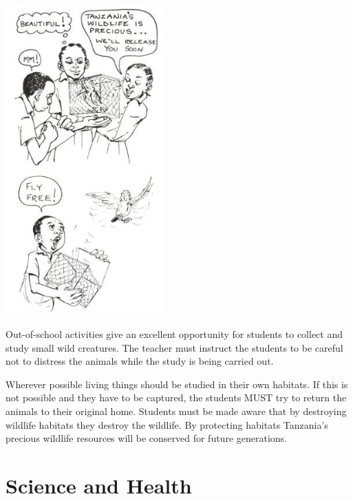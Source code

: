 \begin{multicols}{2}
\begin{center}
\includegraphics[width=0.45\textwidth]{./img/source/wildlife.jpg}
\end{center}

Out-of-school activities give an excellent
opportunity for students to collect and study
small wild creatures. The teacher must instruct
the students to be careful not to distress the
animals while the study is being carried out.

Wherever possible living things should be
studied in their own habitats. If this is not
possible and they have to be captured, the
students MUST try to return the animals to their
original home. Students must be made aware
that by destroying wildlife habitats they destroy
the wildlife. By protecting habitats Tanzania's
precious wildlife resources will be conserved
for future generations.


\section{Science and Health} 


\end{multicols}

